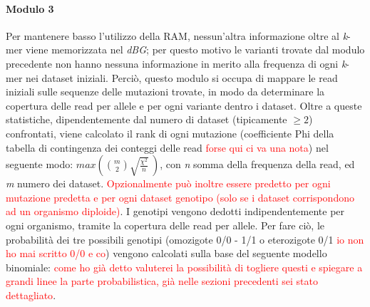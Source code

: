 \documentclass[../main.tex]{subfiles}
\begin{document}
\paragraph{Modulo 3} Per mantenere basso l'utilizzo della RAM, nessun'altra informazione oltre al \textit{k}-mer viene memorizzata nel \textit{dBG}; per questo motivo le varianti trovate dal modulo precedente non hanno nessuna informazione in merito alla frequenza di ogni \textit{k}-mer nei dataset iniziali. Perciò, questo modulo si occupa di mappare le read iniziali sulle sequenze delle mutazioni trovate, in modo da determinare la copertura delle read per allele e per ogni variante dentro i dataset. Oltre a queste statistiche, dipendentemente dal numero di dataset (tipicamente $\geq2$) confrontati, viene calcolato il rank di ogni mutazione (coefficiente Phi della tabella di contingenza dei conteggi delle read \textcolor{red}{forse qui ci va una nota}) nel seguente modo: $max\left( \binom{m}{2}\sqrt{\frac{\chi^2}{n}}\ \right)$, con \textit{n} somma della frequenza della read, ed \textit{m} numero dei dataset. \textcolor{red}{Opzionalmente può inoltre essere predetto per ogni mutazione predetta e per ogni dataset genotipo (solo se i dataset corrispondono ad un organismo diploide)}. I genotipi vengono dedotti indipendentemente per ogni organismo, tramite la copertura delle read per allele. Per fare ciò, le probabilità dei tre possibili genotipi (omozigote 0/0 - 1/1 o eterozigote 0/1  \textcolor{red}{io non ho mai scritto 0/0 e co}) vengono calcolati sulla base del seguente modello binomiale:  \textcolor{red}{come ho già detto valuterei la possibilità di togliere questi e spiegare a grandi linee la parte probabilistica, già nelle sezioni precedenti sei stato dettagliato}.

%
%
%
\end{document}
